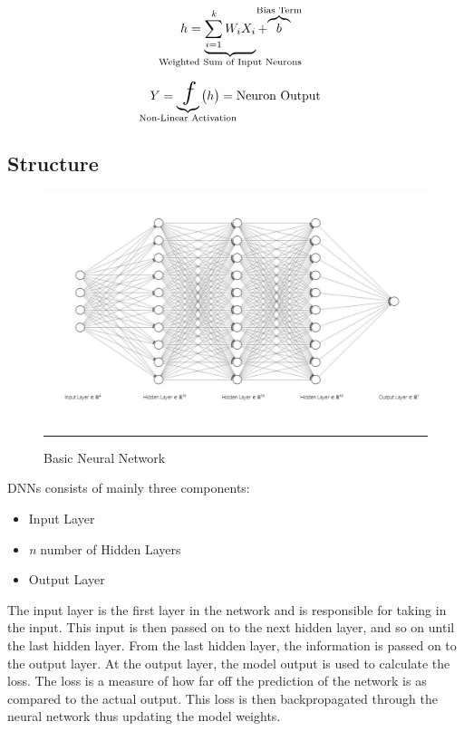 \begin{equation}
h = \underbrace{\sum_{i=1}^{\textit{k}} {W_i}{X_i}}_{\mathclap{\text{Weighted Sum of Input Neurons}}} +\smash{\overbrace{b}^{\mathclap{\text{Bias Term}}}}
\end{equation}

\begin{equation}
Y = \underbrace{\huge{\textit{f}}}_{\mathclap{\text{Non-Linear Activation}}} \, \bigl( h \bigr)  = \text{Neuron Output}
\end{equation}




\subsection{Structure}


\begin{figure}[htbp]
  \centering
    \includegraphics[scale=0.7]{Figures/nn_basic_fig.JPG}
    \rule{35em}{0.5pt}
  \caption[Vanilla Neural Network]{Basic Neural Network}
  \label{fig:basic_nn}
\end{figure}

DNNs consists of mainly three components:
\begin{itemize}[noitemsep,topsep=0pt]
    \item Input Layer
    \item \textit{n} number of Hidden Layers
    \item Output Layer
\end{itemize}

The input layer is the first layer in the network and is responsible for taking in the input. This input is then passed on to the next hidden layer, and so on until the last hidden layer. From the last hidden layer, the information is passed on to the output layer. At the output layer, the model output is used to calculate the loss. The loss is a measure of how far off the prediction of the network is as compared to the actual output. This loss is then backpropagated through the neural network thus updating the model weights.

